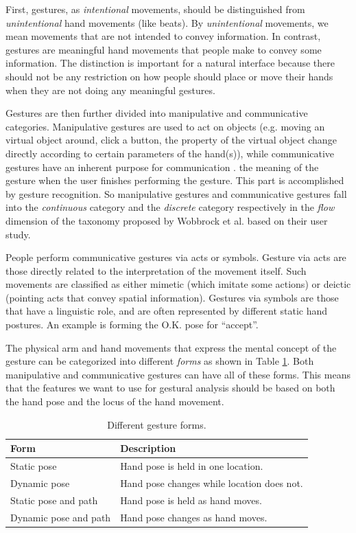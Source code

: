 First, gestures, as \textit{intentional} movements, should be distinguished from
\textit{unintentional} hand movements (like beats). By \textit{unintentional}
movements, we mean movements that are not intended to convey information. In
contrast, gestures are meaningful hand movements that people make to convey some
information. The distinction is important for a natural interface because there
should not be any restriction on how people should place or move their hands
when they are not doing any meaningful gestures. 

Gestures are then further divided into manipulative and communicative
categories. Manipulative gestures are used to act on objects (e.g.
moving an virtual object around, click a button, the property of the virtual
object change directly according to certain parameters of the hand(s)), while
communicative gestures have an inherent purpose for communication \cite{Pavlovic97}. 
the meaning of the gesture when the user finishes performing the gesture. This part is
accomplished by gesture recognition. So manipulative gestures and communicative
gestures fall into the \textit{continuous} category and the
\textit{discrete} category respectively in the \textit{flow} dimension of the
taxonomy proposed by Wobbrock \cite{wobbrock09} et al. based on their
user study.

People perform communicative gestures via acts or symbols. Gesture via acts are
those directly related to the interpretation of the movement itself. Such
movements are classified as either mimetic (which imitate some actions) or
deictic (pointing acts that convey spatial information). Gestures via symbols
are those that have a linguistic role, and are often represented by different static hand postures. An example is forming the
O.K. pose for ``accept''. 

The physical arm and hand movements that express the mental concept of the
gesture can be categorized into different \textit{forms} \cite{wobbrock09} as
shown in Table \ref{tab:form}. Both manipulative and communicative gestures can
have all of these forms. This means that the features we want to use for
gestural analysis should be based on both the hand pose and the locus of the
hand movement.

\begin{table}[h]
  \centering
  \begin{tabular}{| l | l |}
  	\hline
  	\textbf{Form} 		  & \textbf{Description} \\ \hline 
  	Static pose  		  & Hand pose is held in one location. \\ \hline
  	Dynamic pose 		  & Hand pose changes while location does not. \\ \hline
  	Static pose and path  & Hand pose is held as hand moves. \\ \hline
  	Dynamic pose and path & Hand pose changes as hand moves. \\ \hline
  \end{tabular}
  \caption{Different gesture forms.}
  \label{tab:form}
\end{table}

